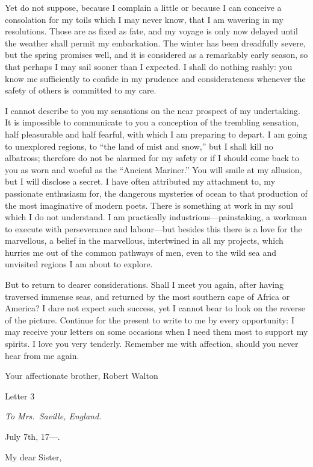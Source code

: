 \documentclass[12pt,openright]{book}
\begin{document}
Yet do not suppose, because I complain a little or because I can conceive a consolation for my toils which I may never know, that I am wavering in my resolutions. Those are as fixed as fate, and my voyage is only now delayed until the weather shall permit my embarkation. The winter has been dreadfully severe, but the spring promises well, and it is considered as a remarkably early season, so that perhaps I may sail sooner than I expected. I shall do nothing rashly: you know me sufficiently to confide in my prudence and considerateness whenever the safety of others is committed to my care.

I cannot describe to you my sensations on the near prospect of my undertaking. It is impossible to communicate to you a conception of the trembling sensation, half pleasurable and half fearful, with which I am preparing to depart. I am going to unexplored regions, to “the land of mist and snow,” but I shall kill no albatross; therefore do not be alarmed for my safety or if I should come back to you as worn and woeful as the “Ancient Mariner.” You will smile at my allusion, but I will disclose a secret. I have often attributed my attachment to, my passionate enthusiasm for, the dangerous mysteries of ocean to that production of the most imaginative of modern poets. There is something at work in my soul which I do not understand. I am practically industrious—painstaking, a workman to execute with perseverance and labour—but besides this there is a love for the marvellous, a belief in the marvellous, intertwined in all my projects, which hurries me out of the common pathways of men, even to the wild sea and unvisited regions I am about to explore.

But to return to dearer considerations. Shall I meet you again, after having traversed immense seas, and returned by the most southern cape of Africa or America? I dare not expect such success, yet I cannot bear to look on the reverse of the picture. Continue for the present to write to me by every opportunity: I may receive your letters on some occasions when I need them most to support my spirits. I love you very tenderly. Remember me with affection, should you never hear from me again.

Your affectionate brother, Robert Walton

Letter 3

\textit{To Mrs. Saville, England.}

July 7th, 17—.

My dear Sister,
\end{document}
